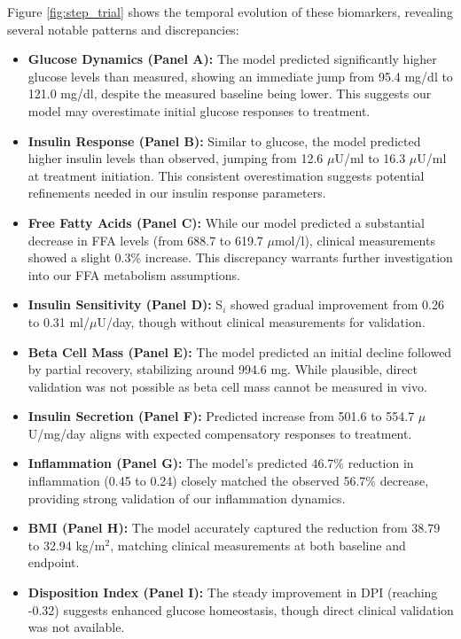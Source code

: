 Figure \ref{fig:step_trial} shows the temporal evolution of these biomarkers, revealing several notable patterns and discrepancies:

\begin{itemize}
    \item \textbf{Glucose Dynamics (Panel A):} The model predicted significantly higher glucose levels than measured, showing an immediate jump from 95.4 mg/dl to 121.0 mg/dl, despite the measured baseline being lower. This suggests our model may overestimate initial glucose responses to treatment.
    
    \item \textbf{Insulin Response (Panel B):} Similar to glucose, the model predicted higher insulin levels than observed, jumping from 12.6 $\mu$U/ml to 16.3 $\mu$U/ml at treatment initiation. This consistent overestimation suggests potential refinements needed in our insulin response parameters.
    
    \item \textbf{Free Fatty Acids (Panel C):} While our model predicted a substantial decrease in FFA levels (from 688.7 to 619.7 $\mu$mol/l), clinical measurements showed a slight 0.3\% increase. This discrepancy warrants further investigation into our FFA metabolism assumptions.
    
    \item \textbf{Insulin Sensitivity (Panel D):} S$_i$ showed gradual improvement from 0.26 to 0.31 ml/$\mu$U/day, though without clinical measurements for validation.
    
    \item \textbf{Beta Cell Mass (Panel E):} The model predicted an initial decline followed by partial recovery, stabilizing around 994.6 mg. While plausible, direct validation was not possible as beta cell mass cannot be measured in vivo.
    
    \item \textbf{Insulin Secretion (Panel F):} Predicted increase from 501.6 to 554.7 $\mu$U/mg/day aligns with expected compensatory responses to treatment.
    
    \item \textbf{Inflammation (Panel G):} The model's predicted 46.7\% reduction in inflammation (0.45 to 0.24) closely matched the observed 56.7\% decrease, providing strong validation of our inflammation dynamics.
    
    \item \textbf{BMI (Panel H):} The model accurately captured the reduction from 38.79 to 32.94 kg/m$^2$, matching clinical measurements at both baseline and endpoint.
    
    \item \textbf{Disposition Index (Panel I):} The steady improvement in DPI (reaching -0.32) suggests enhanced glucose homeostasis, though direct clinical validation was not available.
\end{itemize}

